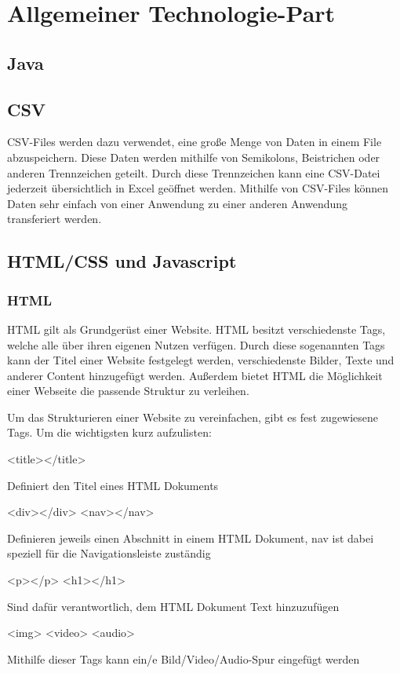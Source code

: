 \section{Allgemeiner Technologie-Part}
 
 
\subsection{Java}
\subsection{CSV}
CSV-Files werden dazu verwendet, eine große Menge von Daten in einem File abzuspeichern. Diese Daten werden mithilfe von Semikolons, Beistrichen oder anderen Trennzeichen geteilt. Durch diese Trennzeichen kann eine CSV-Datei jederzeit übersichtlich in Excel geöffnet werden. Mithilfe von CSV-Files können Daten sehr einfach von einer Anwendung zu einer anderen Anwendung transferiert werden. 
 
 
\subsection{HTML/CSS und Javascript}
 
 
\subsubsection{HTML}
HTML gilt als Grundgerüst einer Website. HTML besitzt verschiedenste Tags, welche alle über ihren eigenen Nutzen verfügen. Durch diese sogenannten Tags kann der Titel einer Website festgelegt werden, verschiedenste Bilder, Texte und anderer Content hinzugefügt werden. Außerdem bietet HTML die Möglichkeit einer Webseite die passende Struktur zu verleihen.
 
Um das Strukturieren einer Website zu vereinfachen, gibt es fest zugewiesene Tags. Um die wichtigsten kurz aufzulisten:
 
\begin{compactitem}
    \item [<title></title>]
    \item Definiert den Titel eines HTML Dokuments
    \item [<div></div> <nav></nav>]
    \item Definieren jeweils einen Abschnitt in einem HTML Dokument, nav ist dabei speziell für die Navigationsleiste zuständig
    \item [<p></p> <h1></h1>]
    \item Sind dafür verantwortlich, dem HTML Dokument Text hinzuzufügen
    \item [<img> <video> <audio>]
    \item Mithilfe dieser Tags kann ein/e Bild/Video/Audio-Spur eingefügt werden
\end{compactitem}
 
